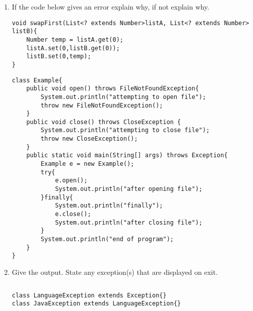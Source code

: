 \documentclass{article}
\begin{document}
\begin{enumerate}
\begin{lstlisting}
\end{lstlisting}
	\item If the code below gives an error explain why, if not explain why.
\begin{lstlisting}
void swapFirst(List<? extends Number>listA, List<? extends Number> listB){
	Number temp = listA.get(0);
 	listA.set(0,listB.get(0));
	listB.set(0,temp);
}
\end{lstlisting}
\begin{lstlisting}
class Example{
 	public void open() throws FileNotFoundException{
  		System.out.println("attempting to open file");
  		throw new FileNotFoundException();
 	}
 	public void close() throws CloseException {
  		System.out.println("attempting to close file");
  		throw new CloseException();
 	}
 	public static void main(String[] args) throws Exception{
  		Example e = new Example();
  		try{ 
   			e.open();
   			System.out.println("after opening file");
  		}finally{ 
   			System.out.println("finally");
   			e.close();
   			System.out.println("after closing file");
  		}
  		System.out.println("end of program");
	}
}
\end{lstlisting}
	\item Give the output. State any exception(s) that are displayed on exit.
\begin{lstlisting}
\end{lstlisting}
	\newpage
\begin{lstlisting}
class LanguageException extends Exception{}
class JavaException extends LanguageException{}


\end{lstlisting}
\end{enumerate}
\end{document}
